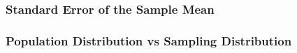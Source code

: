 \documentclass[handout]{beamer}
\newcommand{\blue}[1]{\textcolor{blue2}{#1}}
\newcommand{\xbar}{\overline{x}}
\begin{document}
\begin{frame}[fragile]
\frametitle{Standard Error of the Sample Mean}

%
%
%
%
%
%

\end{frame}


%
%
%
%
%


\begin{frame}[fragile]
\frametitle{Population Distribution vs Sampling Distribution}


\end{frame}
\end{document}
